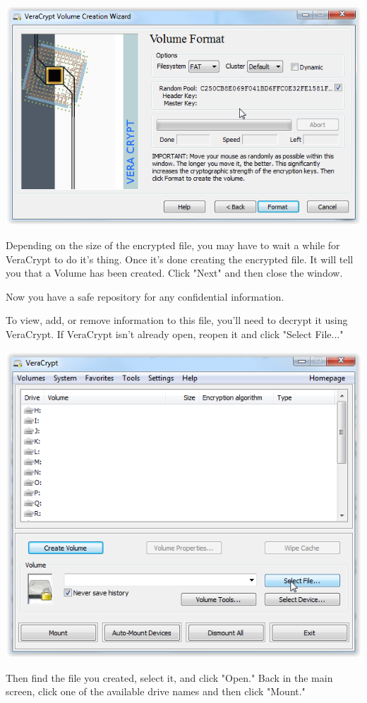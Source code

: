 \documentclass[12pt]{article}
\begin{document}
\includegraphics{imgs/VC07.PNG}

Depending on the size of the encrypted file, you may have to wait a while for VeraCrypt to
do it's thing. Once it's done creating the encrypted file. It will tell you that a Volume has
been created. Click "Next" and then close the window.

Now you have a safe repository for any confidential information.

To view, add, or remove information to this file, you'll need to decrypt it using VeraCrypt.
If VeraCrypt isn't already open, reopen it and click "Select File..."

\includegraphics{imgs/VC08.PNG}

Then find the file you created, select it, and click "Open." Back in the main screen, click one
of the available drive names and then click "Mount."
\end{document}
